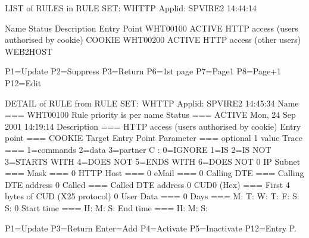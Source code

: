 \documentclass[letterpaper,10pt,english]{sphinxmanual}
\begin{document}
\begin{sphinxVerbatim}[commandchars=\\\{\}]
LIST of RULES in RULE SET: W\PYGZhy{}HTTP \PYGZhy{}\PYGZhy{}\PYGZhy{}\PYGZhy{}\PYGZhy{}\PYGZhy{}\PYGZhy{}\PYGZhy{}\PYGZhy{}\PYGZhy{}\PYGZhy{}\PYGZhy{}\PYGZhy{}\PYGZhy{}\PYGZhy{}\PYGZhy{} Applid: SPVIRE2     14:44:14

Name     Status   Description                                        Entry
                                                                     Point
WHT00100 ACTIVE   HTTP access (users authorised by cookie)           \PYGZdl{}COOKIE\PYGZdl{}
WHT00200 ACTIVE   HTTP access (other users)                          WEB2HOST

P1=Update            P2=Suppress             P3=Return
P6=1st page          P7=Page\PYGZhy{}1               P8=Page+1              P12=Edit
\end{sphinxVerbatim}


\begin{sphinxVerbatim}[commandchars=\\\{\}]
DETAIL of RULE from RULE SET: W\PYGZhy{}HTTP \PYGZhy{}\PYGZhy{}\PYGZhy{}\PYGZhy{}\PYGZhy{}\PYGZhy{}\PYGZhy{}\PYGZhy{}\PYGZhy{}\PYGZhy{}\PYGZhy{}\PYGZhy{}\PYGZhy{} Applid: SPVIRE2 14:45:34
Name          ===\PYGZgt{} WHT00100              Rule priority is per name
Status        ===\PYGZgt{} ACTIVE                Mon, 24 Sep 2001 14:19:14
Description   ===\PYGZgt{} HTTP access (users authorised by cookie)
Entry point   ===\PYGZgt{} \PYGZdl{}COOKIE\PYGZdl{}              Target Entry Point
Parameter     ===\PYGZgt{}                                  optional \PYGZam{}1 value
Trace         ===\PYGZgt{}                       1=commands 2=data 3=partner
C : 0=IGNORE 1=IS 2=IS NOT 3=STARTS WITH 4=DOES NOT 5=ENDS WITH 6=DOES NOT
0 IP Subnet   ===\PYGZgt{}                       Mask ===\PYGZgt{}
0 HTTP Host   ===\PYGZgt{}
0 eMail       ===\PYGZgt{}
0 Calling DTE ===\PYGZgt{}                       Calling DTE address
0 Called      ===\PYGZgt{}                       Called DTE address
0 CUD0 (Hex)  ===\PYGZgt{}                       First 4 bytes of CUD (X25 protocol)
0 User Data   ===\PYGZgt{}
0 Days        ===\PYGZgt{} M:      T:      W:      T:      F:      S:      S:
0 Start time  ===\PYGZgt{} H:      M:      S:     End time ===\PYGZgt{} H:     M:     S:

P1=Update                          P3=Return                    Enter=Add
P4=Activate                        P5=Inactivate                P12=Entry P.
\end{sphinxVerbatim}
\end{document}
